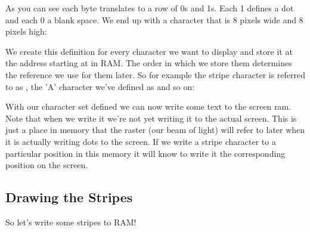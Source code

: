 As you can see each byte translates to a row of 0s and 1s. Each 1 defines a dot and each 0 a blank space. We end up
with a character that is 8 pixels wide and 8 pixels high:



We create this definition for every character we want to display and store it at the address starting at 
in RAM. The order in which we store them determines the reference we use for them later. So for example the stripe
character is referred to as , the 'A' character we've defined as  and so on:



With our character set defined we can now write some text to the screen ram. Note that when we write it 
we're not yet writing it to the actual screen. This is just a place in memory that the raster (our beam of light)
will refer to later when it is actually writing dots to the screen. If we write a stripe character to a particular position
in this  memory it will know to write it the corresponding position on the screen.

\subsection{Drawing the Stripes}
So let's write some stripes to RAM!

